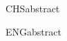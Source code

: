 
\begin{CHSabstract}

    
    CHSabstract
    

\end{CHSabstract}

\begin{ENGabstract}	
    
	ENGabstract

\end{ENGabstract}

